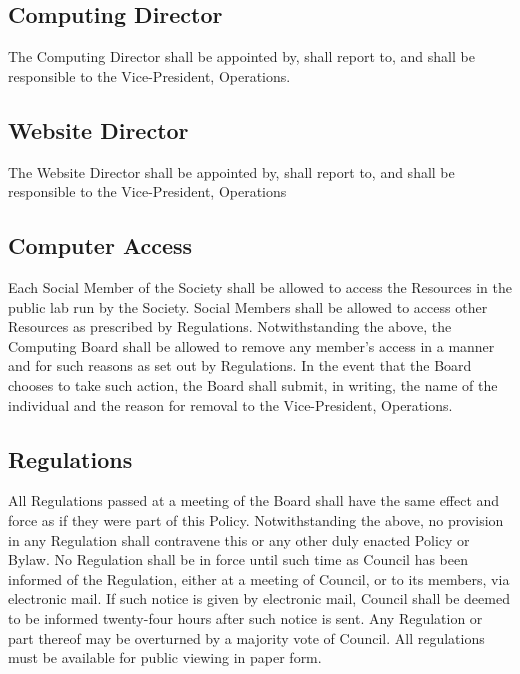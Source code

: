 \subsection{Computing Director}
The Computing Director shall be appointed by, shall report to, and shall be responsible to the Vice-President, Operations.

\subsection{Website Director}
The Website Director shall be appointed by, shall report to, and shall be responsible to the Vice-President, Operations

\subsection{Computer Access}
Each Social Member of the Society shall be allowed to access the Resources in the public lab run by the Society.
Social Members shall be allowed to access other Resources as prescribed by Regulations.
Notwithstanding the above, the Computing Board shall be allowed to remove any member’s access in a manner and for such reasons as set out by Regulations. In the event that the Board chooses to take such action, the Board shall submit, in writing, the name of the individual and the reason for removal to the Vice-President, Operations.

\subsection{Regulations}
All Regulations passed at a meeting of the Board shall have the same effect and force as if they were part of this Policy.
Notwithstanding the above, no provision in any Regulation shall contravene this or any other duly enacted Policy or Bylaw.
No Regulation shall be in force until such time as Council has been informed of the Regulation, either at a meeting of Council, or to its members, via electronic mail. If such notice is given by electronic mail, Council shall be deemed to be informed twenty-four hours after such notice is sent.
Any Regulation or part thereof may be overturned by a majority vote of Council.
All regulations must be available for public viewing in paper form.

